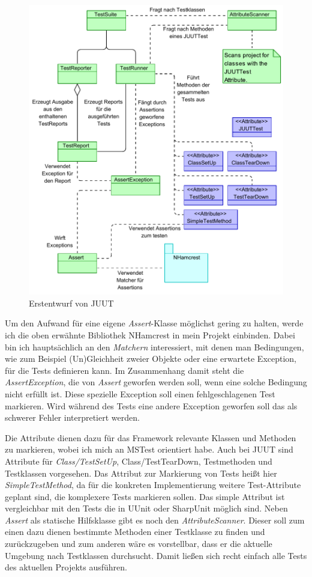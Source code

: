 \begin{figure}
\centering
\includegraphics[width=0.9\linewidth]{images/Kapitel_ErstentwurfDesFrameworks/WalkingSkeleton}
\caption[Erstentwurf von JUUT]{Erstentwurf von JUUT}
\label{fig:WalkingSkeleton}
\end{figure}
\clearpage

Um den Aufwand für eine eigene \textit{Assert}-Klasse möglichst gering zu halten, werde ich die oben erwähnte Bibliothek NHamcrest in mein Projekt einbinden. Dabei bin ich hauptsächlich an den \textit{Matchern} interessiert, mit denen man Bedingungen, wie zum Beispiel (Un)Gleichheit zweier Objekte oder eine erwartete Exception, für die Tests definieren kann. Im Zusammenhang damit steht die \textit{AssertException}, die von \textit{Assert} geworfen werden soll, wenn eine solche Bedingung nicht erfüllt ist. Diese spezielle Exception soll einen fehlgeschlagenen Test markieren. Wird während des Tests eine andere Exception geworfen soll das als schwerer Fehler interpretiert werden.

Die Attribute dienen dazu für das Framework relevante Klassen und Methoden zu markieren, wobei ich mich an MSTest orientiert habe. Auch bei JUUT sind Attribute für \textit{Class/TestSetUp}, {Class/TestTearDown}, Testmethoden und Testklassen vorgesehen. Das Attribut zur Markierung von Tests heißt hier \textit{SimpleTestMethod}, da für die konkreten Implementierung weitere Test-Attribute geplant sind, die komplexere Tests markieren sollen. Das simple Attribut ist vergleichbar mit den Tests die in UUnit oder SharpUnit möglich sind.
Neben \textit{Assert} als statische Hilfsklasse gibt es noch den \textit{AttributeScanner}. Dieser soll zum einen dazu dienen bestimmte Methoden einer Testklasse zu finden und zurückzugeben und zum anderen wäre es vorstellbar, dass er die aktuelle Umgebung nach Testklassen durchsucht. Damit ließen sich recht einfach alle Tests des aktuellen Projekts ausführen.

